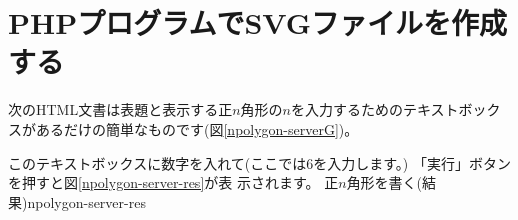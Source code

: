 \section{PHPプログラムでSVGファイルを作成する}
次のHTML文書は表題と表示する正$n$角形の$n$を入力するためのテキストボック
スがあるだけの簡単なものです(図\ref{npolygon-serverG})。


このテキストボックスに数字を入れて(ここでは$6$を入力します。)
「実行」ボタンを押すと図\ref{npolygon-server-res}が表
示されます。
{正$n$角形を書く(結果)}{npolygon-server-res}

